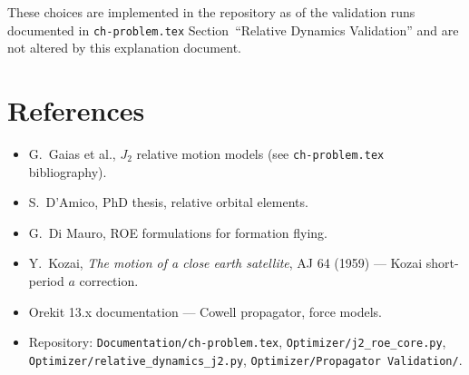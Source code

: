 \documentclass[11pt]{article}
\begin{document}
These choices are implemented in the repository as of the validation runs documented in \texttt{ch-problem.tex} Section~``Relative Dynamics Validation'' and are not altered by this explanation document.

\section*{References}
\begin{itemize}
    \item G.~Gaias et al., $J_2$ relative motion models (see \texttt{ch-problem.tex} bibliography).
    \item S.~D'Amico, PhD thesis, relative orbital elements.
    \item G.~Di Mauro, ROE formulations for formation flying.
    \item Y.~Kozai, \emph{The motion of a close earth satellite}, AJ 64 (1959) --- Kozai short-period $a$ correction.
    \item Orekit 13.x documentation --- Cowell propagator, force models.
    \item Repository: \texttt{Documentation/ch-problem.tex}, \texttt{Optimizer/j2\_roe\_core.py}, \texttt{Optimizer/relative\_dynamics\_j2.py}, \texttt{Optimizer/Propagator Validation/}.
\end{itemize}
\end{document}
